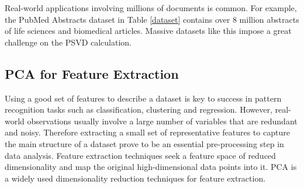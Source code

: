 \documentclass[11pt]{article}
\numberwithin{equation}{section}
\numberwithin{figure}{section}
\numberwithin{table}{section}
\begin{document}
Real-world applications involving millions of documents is common. For example, the PubMed Abstracts dataset in Table \ref{dataset} contains over 8 million abstracts of life sciences and biomedical articles. Massive datasets like this impose a great challenge on the PSVD calculation.





\subsection{PCA for Feature Extraction}
\label{PCA}

Using a good set of features to describe a dataset is key to success in pattern recognition tasks such as classification, clustering and regression. However, real-world observations usually involve a large number of variables that are redundant and noisy. Therefore extracting a small set of representative features to capture the main structure of a dataset prove to be an essential pre-processing step in data analysis. Feature extraction techniques seek a feature space of reduced dimensionality and map the original high-dimensional data points into it. PCA \cite{PCA}
is a widely used dimensionality reduction techniques for feature extraction.
\end{document}
